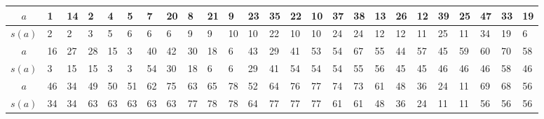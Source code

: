 \begin{center}
\begin{minipage}{\textwidth}
\renewcommand{\arraystretch}{1.1}
\begin{scriptsize}
\begin{tabular}{|c|*{24}{|p{.15cm}}|}
\hline
$a$&1&14&2&4&5&7&20&8&21&9&23&35&22&10&37&38&13&26&12&39&25&47&33&19 \\
\hline
$s(a)$&2&2&3&5&6&6&6&9&9&10&10&22&10&10&24&24&12&12&11&25&11&34&19&6\\
\hline \hline
$a$&16&27&28&15&3&40&42&30&18&6&43&29&41&53&54&67&55&44&57&45&59&60&70&58\\
\hline
$s(a)$&3&15&15&3&3&54&30&18&6&6&29&41&54&54&54&55&56&45&45&46&46&46&58&46\\
\hline \hline
$a$&46&34&49&50&51&62&75&63&65&78&52&64&76&77&74&73&61&48&36&24&11&69&68&56\\
\hline
$s(a)$&34&34&63&63&63&63&63&77&78&78&64&77&77&77&61&61&48&36&24&11&11&56&56&56\\
\hline
\end{tabular}
\label{Beispiel_CO_NW}
\end{scriptsize} 
\renewcommand{\arraystretch}{1}


\end{minipage}
\end{center}
